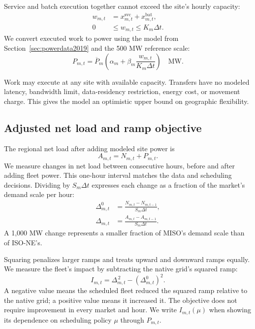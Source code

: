 \documentclass[conference]{IEEEtran}
\begin{document}
Service and batch execution together cannot exceed the site's hourly
capacity:
\begin{align}
  w_{m,t}
  &=
  x^{\mathrm{svc}}_{m,t}
  +x^{\mathrm{bat}}_{m,t},
  \label{eq:executed-work}\\
  0
  &\leq w_{m,t}\leq K_m\Delta t.
  \label{eq:site-capacity}
\end{align}
We convert executed work to power using the model from
Section~\ref{sec:powerdata2019} and the 500 MW reference scale:
\begin{equation}
  P_{m,t}
  =
  \overline P_m
  \left(
    \alpha_m+\beta_m\frac{w_{m,t}}{K_m\Delta t}
  \right)
  \quad\mathrm{MW}.
  \label{eq:runtime-power}
\end{equation}


Work may execute at any site with available capacity. Transfers have no
modeled latency, bandwidth limit, data-residency restriction, energy cost,
or movement charge. This gives the model an optimistic upper bound on
geographic flexibility.

\subsection{Adjusted net load and ramp objective}
\label{subsec:problem-objective}

The regional net load after adding modeled site power is
\begin{equation}
  A_{m,t}
  =
  N_{m,t}+P_{m,t}.
  \label{eq:adjusted-net-load}
\end{equation}
We measure changes in net load between consecutive hours, before and after
adding fleet power. This one-hour interval matches the data and scheduling
decisions. Dividing by \(S_m\Delta t\) expresses each change as a fraction of
the market's demand scale per hour:
\begin{align}
  \Delta^0_{m,t}
  &=
  \frac{N_{m,t}-N_{m,t-1}}{S_m\Delta t},
  \label{eq:native-ramp}\\
  \Delta_{m,t}
  &=
  \frac{A_{m,t}-A_{m,t-1}}{S_m\Delta t}.
  \label{eq:adjusted-ramp}
\end{align}
A 1,000 MW change represents a smaller fraction of MISO's demand scale than
of ISO-NE's.

Squaring penalizes larger ramps and treats upward and downward ramps
equally. We measure the fleet's impact by subtracting the native grid's
squared ramp:
\begin{equation}
  I_{m,t}
  =
  \Delta_{m,t}^{\,2}
  -
  \left(\Delta^0_{m,t}\right)^2.
  \label{eq:incremental-impact}
\end{equation}
A negative value means the scheduled fleet reduced the squared ramp relative
to the native grid; a positive value means it increased it. The objective
does not require improvement in every market and hour. We write
\(I_{m,t}(\mu)\) when showing its dependence on scheduling policy \(\mu\)
through \(P_{m,t}\).
\end{document}
